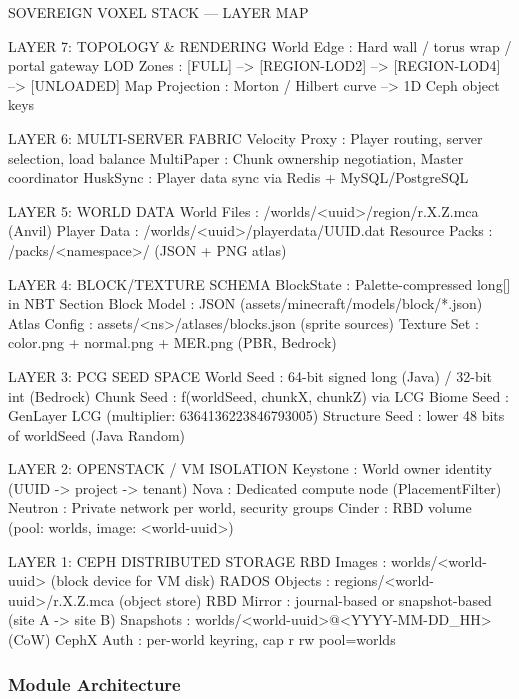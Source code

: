 \documentclass[11pt,letterpaper]{article}
\begin{document}
\begin{asciibox}
SOVEREIGN VOXEL STACK --- LAYER MAP

LAYER 7: TOPOLOGY & RENDERING
  World Edge      : Hard wall / torus wrap / portal gateway
  LOD Zones       : [FULL] --> [REGION-LOD2] --> [REGION-LOD4] --> [UNLOADED]
  Map Projection  : Morton / Hilbert curve --> 1D Ceph object keys

LAYER 6: MULTI-SERVER FABRIC
  Velocity Proxy  : Player routing, server selection, load balance
  MultiPaper      : Chunk ownership negotiation, Master coordinator
  HuskSync        : Player data sync via Redis + MySQL/PostgreSQL

LAYER 5: WORLD DATA
  World Files     : /worlds/<uuid>/region/r.X.Z.mca  (Anvil)
  Player Data     : /worlds/<uuid>/playerdata/UUID.dat
  Resource Packs  : /packs/<namespace>/  (JSON + PNG atlas)

LAYER 4: BLOCK/TEXTURE SCHEMA
  BlockState      : Palette-compressed long[] in NBT Section
  Block Model     : JSON (assets/minecraft/models/block/*.json)
  Atlas Config    : assets/<ns>/atlases/blocks.json  (sprite sources)
  Texture Set     : color.png + normal.png + MER.png  (PBR, Bedrock)

LAYER 3: PCG SEED SPACE
  World Seed      : 64-bit signed long (Java) / 32-bit int (Bedrock)
  Chunk Seed      : f(worldSeed, chunkX, chunkZ)  via LCG
  Biome Seed      : GenLayer LCG  (multiplier: 6364136223846793005)
  Structure Seed  : lower 48 bits of worldSeed  (Java Random)

LAYER 2: OPENSTACK / VM ISOLATION
  Keystone        : World owner identity (UUID -> project -> tenant)
  Nova            : Dedicated compute node (PlacementFilter)
  Neutron         : Private network per world, security groups
  Cinder          : RBD volume  (pool: worlds, image: <world-uuid>)

LAYER 1: CEPH DISTRIBUTED STORAGE
  RBD Images      : worlds/<world-uuid>  (block device for VM disk)
  RADOS Objects   : regions/<world-uuid>/r.X.Z.mca  (object store)
  RBD Mirror      : journal-based or snapshot-based (site A -> site B)
  Snapshots       : worlds/<world-uuid>@<YYYY-MM-DD_HH>  (CoW)
  CephX Auth      : per-world keyring, cap r rw pool=worlds
\end{asciibox}

\subsubsection{Module Architecture}
\end{document}
